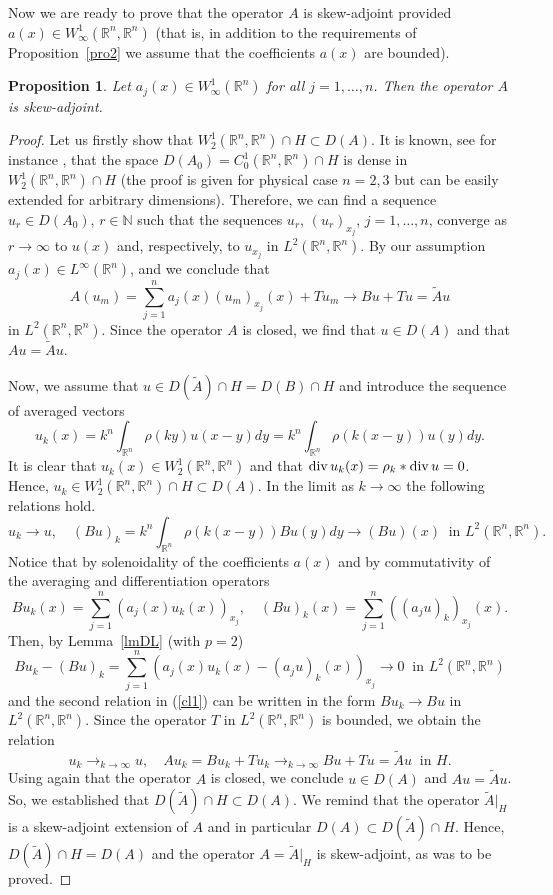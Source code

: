 \documentclass[12pt]{article}
\newcommand{\R}{{\mathbb R}}
\newcommand{\N}{{\mathbb N}}
\renewcommand{\div}{\mathop{\rm div}\nolimits}
\numberwithin{equation}{section}
\theoremstyle{plain}
\newtheorem{proposition}{Proposition}[section]
\theoremstyle{definition}
\begin{document}
Now we are ready to prove that the operator $A$ is skew-adjoint provided ${a(x)\in W_\infty^1(\R^n,\R^n)}$ (that is, in addition to the requirements of Proposition~\ref{pro2} we assume that the coefficients $a(x)$ are bounded).

\begin{proposition}\label{pro3}
Let $a_j(x)\in W_\infty^1(\R^n)$ for all $j=1,\ldots,n$. Then the operator $A$ is skew-adjoint.
\end{proposition}

\begin{proof}
Let us firstly show that $W_2^1(\R^n,\R^n)\cap H\subset D(A)$.
It is known, see for instance \cite[Lemma 3.1]{LadSol}, that the space $D(A_0)=C_0^1(\R^n,\R^n)\cap H$ is dense in  $W_2^1(\R^n,\R^n)\cap H$ (the proof is given for physical case $n=2,3$ but can be easily extended for arbitrary dimensions). Therefore, we can find a sequence $u_r\in D(A_0)$, $r\in\N$ such that the sequences $u_r$, $(u_r)_{x_j}$, $j=1,\ldots,n$, converge as $r\to\infty$ to $u(x)$ and, respectively, to $u_{x_j}$ in $L^2(\R^n,\R^n)$. By our assumption $a_j(x)\in L^\infty(\R^n)$, and we conclude that \[A(u_m)=\sum_{j=1}^n a_j(x)(u_m)_{x_j}(x)+Tu_m\to Bu+Tu=\tilde Au\] in $L^2(\R^n,\R^n)$. Since the operator $A$ is closed, we find that $u\in D(A)$ and that $Au=\tilde Au$.

Now, we assume that $u\in D(\tilde A)\cap H=D(B)\cap H$ and introduce the sequence of averaged vectors \[u_k(x)=k^n\int_{\R^n}\rho(ky)u(x-y)dy=k^n\int_{\R^n}\rho(k(x-y))u(y)dy.\]
It is clear that $u_k(x)\in W_2^1(\R^n,\R^n)$ and that $\displaystyle\div u_k(x)=\rho_k*\div u=0$. Hence, $u_k\in  W_2^1(\R^n,\R^n)\cap H\subset D(A)$.
In the limit as $k\to\infty$ the following relations hold.
\begin{equation}\label{cl1}
u_k\to u, \quad (Bu)_k=k^n\int_{\R^n}\rho(k(x-y))Bu(y)dy\to (Bu)(x) \ \mbox{ in } L^2(\R^n,\R^n).
\end{equation}
Notice that by solenoidality of the coefficients $a(x)$ and by commutativity of the averaging and differentiation operators
\[ Bu_k(x)=\sum_{j=1}^n (a_j(x)u_k(x))_{x_j}, \quad (Bu)_k(x)=\sum_{j=1}^n ((a_ju)_k)_{x_j}(x).\]
Then, by Lemma~\ref{lmDL} (with $p=2$)
\[Bu_k-(Bu)_k=\sum_{j=1}^n (a_j(x)u_k(x)-(a_ju)_k(x))_{x_j}\to 0 \ \mbox{ in } L^2(\R^n,\R^n)\]
and the second relation in (\ref{cl1}) can be written in the form
$Bu_k\to Bu$ in $L^2(\R^n,\R^n)$. Since the operator $T$ in $L^2(\R^n,\R^n)$ is bounded, we obtain the relation
\[
u_k\mathop{\to}_{k\to\infty} u, \quad Au_k=Bu_k+Tu_k\mathop{\to}_{k\to\infty} Bu+Tu=\tilde Au \ \mbox{ in } H.\]
Using again that the operator $A$ is closed, we conclude $u\in D(A)$ and $Au=\tilde Au$. So, we established that
$D(\tilde A)\cap H\subset D(A)$. We remind that the operator $\tilde A|_H$ is a skew-adjoint extension of $A$ and in particular $D(A)\subset D(\tilde A)\cap H$. Hence, $D(\tilde A)\cap H=D(A)$ and the operator $A=\tilde A|_H$ is skew-adjoint, as was to be proved.
\end{proof}
\end{document}
